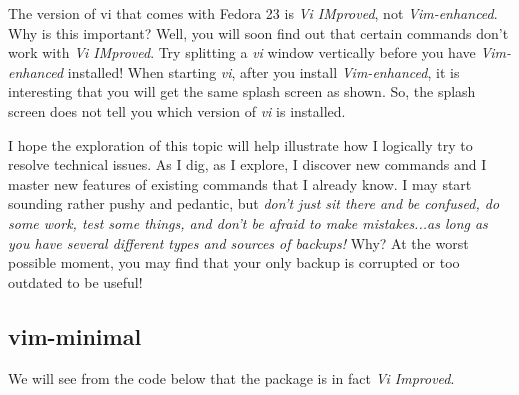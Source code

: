 The version of vi that comes with Fedora 23 is \emph{Vi IMproved}, not \emph{Vim-enhanced}. Why is this important? Well, you will soon find out that certain commands don't work with \emph{Vi IMproved}. Try splitting a \emph{vi} window vertically before you have \emph{Vim-enhanced} installed! When starting \emph{vi}, after you install \emph{Vim-enhanced}, it is interesting that you will get the same splash screen as shown. So, the splash screen does not tell you which version of \emph{vi} is installed.

I hope the exploration of this topic will help illustrate how I logically try to resolve technical issues. As I dig, as I explore, I discover new commands and I master new features of existing commands that I already know. I may start sounding rather pushy and pedantic, but \textit{don't just sit there and be confused, do some work, test some things, and don't be afraid to make mistakes...as long as you have several different types and sources of backups!} Why? At the worst possible moment, you may find that your only backup is corrupted or too outdated to be useful!

\subsection{vim-minimal}

We will see from the code below that the package  is in fact \emph{Vi Improved}.


